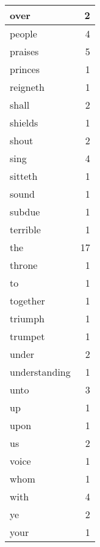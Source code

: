 \begin{center}
\begin{longtable}{l|r}
over & 2 \\ \hline
people & 4 \\ \hline
praises & 5 \\ \hline
princes & 1 \\ \hline
reigneth & 1 \\ \hline
shall & 2 \\ \hline
shields & 1 \\ \hline
shout & 2 \\ \hline
sing & 4 \\ \hline
sitteth & 1 \\ \hline
sound & 1 \\ \hline
subdue & 1 \\ \hline
terrible & 1 \\ \hline
the & 17 \\ \hline
throne & 1 \\ \hline
to & 1 \\ \hline
together & 1 \\ \hline
triumph & 1 \\ \hline
trumpet & 1 \\ \hline
under & 2 \\ \hline
understanding & 1 \\ \hline
unto & 3 \\ \hline
up & 1 \\ \hline
upon & 1 \\ \hline
us & 2 \\ \hline
voice & 1 \\ \hline
whom & 1 \\ \hline
with & 4 \\ \hline
ye & 2 \\ \hline
your & 1 \\ \hline
\end{longtable}
\end{center}



\normalsize



